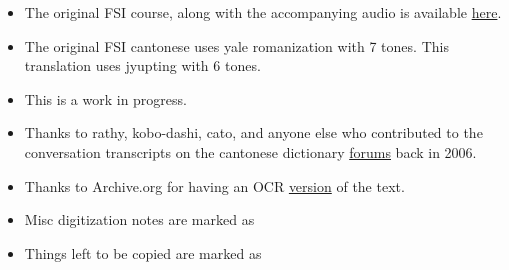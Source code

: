 \begin{itemize}
    \item The original FSI course, along with the accompanying audio is available \href{https://fsi-languages.yojik.eu/languages/FSI/fsi-cantonese.html}{here}.
    \item The original FSI cantonese uses yale romanization with 7 tones. This translation uses jyupting with 6 tones.
    \item This is a work in progress.
    \item Thanks to rathy, kobo-dashi, cato, and anyone else who contributed to the conversation transcripts on the cantonese dictionary \href{http://www.cantonese.sheik.co.uk/phorum/read.php?1,53361,page=1}{forums} back in 2006.
    \item Thanks to Archive.org for having an OCR \href{https://archive.org/stream/Fsi-CantoneseBasicCourse-StudentText/Fsi-CantoneseBasicCourse-Volume1-StudentText_djvu.txt}{version} of the text.
    \item Misc digitization notes are marked as 
    \item Things left to be copied are marked as 
\end{itemize}
